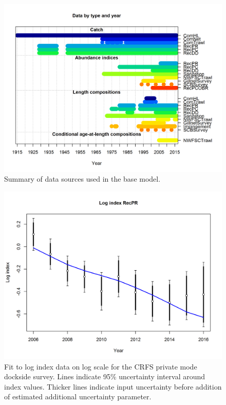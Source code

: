\documentclass[12pt,]{article}
\begin{document}
\begin{figure}[htbp]
\centering
\includegraphics{r4ss/plots_mod1/data_plot.png}
\caption{Summary of data sources used in the base model.
\label{fig:data_plot}}
\end{figure}

\FloatBarrier

\FloatBarrier

\FloatBarrier

\begin{figure}[htbp]
\centering
\includegraphics{r4ss/plots_mod1/index5_logcpuefit_RecPR.png}
\caption{Fit to log index data on log scale for the CRFS private mode
dockside survey. Lines indicate 95\% uncertainty interval around index
values. Thicker lines indicate input uncertainty before addition of
estimated additional uncertainty parameter. \label{fig:RecPR_indexfit}}
\end{figure}
\end{document}
